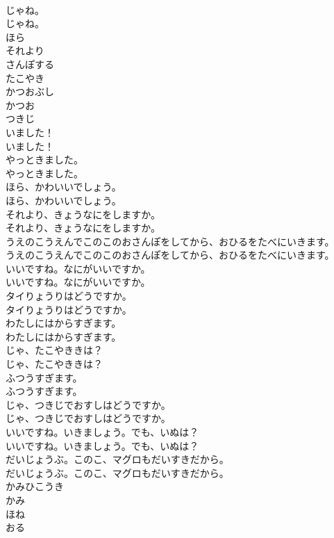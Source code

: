 \documentclass[8pt]{extreport}
\begin{document}
\begin{CJK}{UTF8}{min}
\\	じゃね。	
\\	じゃね。 
\\	ほら
\\	それより
\\	さんぽする
\\	たこやき
\\	かつおぶし
\\	かつお
\\	つきじ
\\	いました！	
\\	いました！ 
\\	やっときました。	
\\	やっときました。 
\\	ほら、かわいいでしょう。	
\\	ほら、かわいいでしょう。 
\\	それより、きょうなにをしますか。	
\\	それより、きょうなにをしますか。 
\\	うえのこうえんでこのこのおさんぽをしてから、おひるをたべにいきます。	
\\	うえのこうえんでこのこのおさんぽをしてから、おひるをたべにいきます。 
\\	いいですね。なにがいいですか。	
\\	いいですね。なにがいいですか。 
\\	タイりょうりはどうですか。	
\\	タイりょうりはどうですか。 
\\	わたしにはからすぎます。	
\\	わたしにはからすぎます。 
\\	じゃ、たこやききは？	
\\	じゃ、たこやききは？ 
\\	ふつうすぎます。	
\\	ふつうすぎます。 
\\	じゃ、つきじでおすしはどうですか。	
\\	じゃ、つきじでおすしはどうですか。 
\\	いいですね。いきましょう。でも、いぬは？	
\\	いいですね。いきましょう。でも、いぬは？ 
\\	だいじょうぶ。このこ、マグロもだいすきだから。	
\\	だいじょうぶ。このこ、マグロもだいすきだから。 
\\	かみひこうき
\\	かみ
\\	ほね
\\	おる

\end{CJK}
\end{document}
